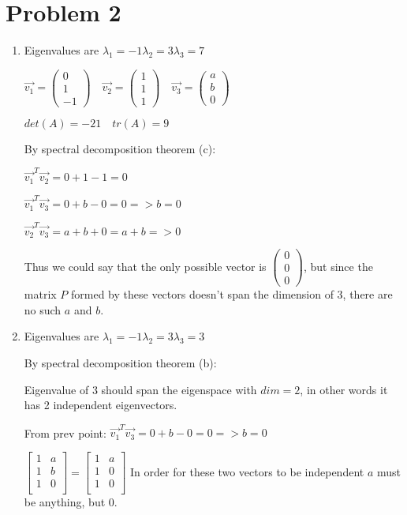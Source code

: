 \documentclass[12pt,letterpaper]{article}
\begin{document}
\section*{Problem 2}
    \begin{enumerate}[label=(\alph*)]
        \item 
        Eigenvalues are $\lambda_1 = -1 \lambda_2 = 3 \lambda_3 = 7$
        
        $\vec{v_1} = \begin{pmatrix} 0 \\ 1 \\ -1 \end{pmatrix} \quad
         \vec{v_2} = \begin{pmatrix} 1 \\ 1 \\ 1 \end{pmatrix} \quad
         \vec{v_3} = \begin{pmatrix} a \\ b \\ 0 \end{pmatrix}$
         
        $det(A) = -21\quad tr(A) = 9$
        
        By spectral decomposition theorem (c):
        
        $\vec{v_1}^T \vec{v_2} = 0 + 1 - 1 = 0$
        
        $\vec{v_1}^T \vec{v_3} = 0 + b - 0 = 0 => b = 0$
        
        $\vec{v_2}^T \vec{v_3} = a + b + 0 = a + b => 0$
        
        Thus we could say that the only possible vector is $\begin{pmatrix} 0 \\ 0 \\ 0 \end{pmatrix}$, but since the matrix $P$ formed by these vectors doesn't span the dimension of 3, there are no such $a$ and $b$.
        \item
        Eigenvalues are $\lambda_1 = -1 \lambda_2 = 3 \lambda_3 = 3$
        
        By spectral decomposition theorem (b):
        
        Eigenvalue of 3 should span the eigenspace with $dim = 2$, in other words it has 2 independent eigenvectors.
        
        From prev point: $\vec{v_1}^T \vec{v_3} = 0 + b - 0 = 0 => b = 0$
        
        $\begin{bmatrix}
            1 & a \\
            1 & b \\
            1 & 0 \\
        \end{bmatrix} = \begin{bmatrix}
            1 & a \\
            1 & 0 \\
            1 & 0 \\
        \end{bmatrix}$
        In order for these two vectors to be independent $a$ must be anything, but 0.
        

\end{enumerate}
\end{document}
